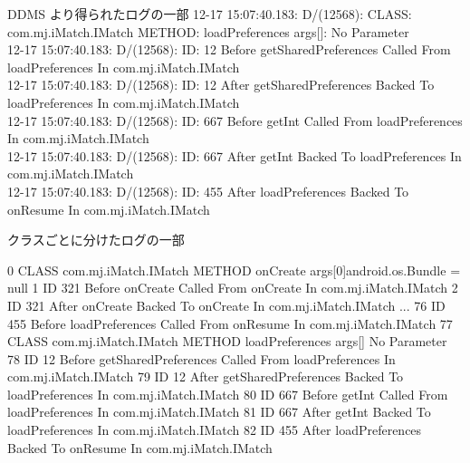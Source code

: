 \begin{itembox}[c]{DDMS より得られたログの一部}
{12-17 15:07:40.183: D/(12568): CLASS: com.mj.iMatch.IMatch METHOD: loadPreferences args[]: No Parameter\\
12-17 15:07:40.183: D/(12568): ID: 12 Before getSharedPreferences Called From loadPreferences In com.mj.iMatch.IMatch\\
12-17 15:07:40.183: D/(12568): ID: 12 After getSharedPreferences Backed To  loadPreferences In com.mj.iMatch.IMatch\\
12-17 15:07:40.183: D/(12568): ID: 667 Before getInt Called From loadPreferences In com.mj.iMatch.IMatch\\
12-17 15:07:40.183: D/(12568): ID: 667 After getInt Backed To  loadPreferences In com.mj.iMatch.IMatch\\
12-17 15:07:40.183: D/(12568): ID: 455 After loadPreferences Backed To  onResume In com.mj.iMatch.IMatch\\
}
\end{itembox}


\begin{itembox}[c]{クラスごとに分けたログの一部}
\footnotesize{
\begin{verbatimtab}[4]
0 CLASS com.mj.iMatch.IMatch METHOD onCreate args[0]android.os.Bundle = null
1	 ID 321 Before onCreate Called From onCreate In com.mj.iMatch.IMatch
2	 ID 321 After onCreate Backed To  onCreate In com.mj.iMatch.IMatch
...
76	 ID 455 Before loadPreferences Called From onResume In com.mj.iMatch.IMatch
77	 CLASS com.mj.iMatch.IMatch METHOD loadPreferences args[] No Parameter
78		 ID 12 Before getSharedPreferences Called From loadPreferences 
In com.mj.iMatch.IMatch
79		 ID 12 After getSharedPreferences Backed To  loadPreferences 
In com.mj.iMatch.IMatch
80		 ID 667 Before getInt Called From loadPreferences In com.mj.iMatch.IMatch
81		 ID 667 After getInt Backed To  loadPreferences In com.mj.iMatch.IMatch
82	 ID 455 After loadPreferences Backed To  onResume In com.mj.iMatch.IMatch

\end{verbatimtab}
}
\end{itembox}
